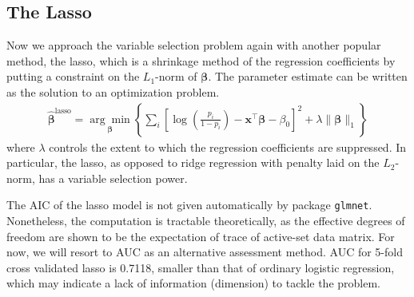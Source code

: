 \subsection{The Lasso}
Now we approach the variable selection problem again with another popular method, the lasso, which is a shrinkage method of the regression coefficients by putting a constraint on the $L_1$-norm of $\boldsymbol{\beta}$. The parameter estimate can be written as the solution to an optimization problem.
\begin{align}
\widehat{\boldsymbol{\beta}}^{\text{lasso}}=\underset{\boldsymbol{\beta}}{\arg\min}\left\{\sum_i\left[\log\left(\frac{p_i}{1-p_i}\right)-\mathbf{x}^\top\boldsymbol{\beta}-\beta_0\right]^2+\lambda\|\boldsymbol{\beta}\|_1\right\}
\end{align}
where $\lambda$ controls the extent to which the regression coefficients are suppressed. In particular, the lasso, as opposed to ridge regression with penalty laid on the $L_2$-norm, has a variable selection power.
\par The AIC of the lasso model is not given automatically by package \texttt{glmnet}. Nonetheless, the computation is tractable theoretically, as the effective degrees of freedom are shown to be the expectation of trace of active-set data matrix. For now, we will resort to AUC as an alternative assessment method. AUC for 5-fold cross validated lasso is 0.7118, smaller than that of ordinary logistic regression, which may indicate a lack of information (dimension) to tackle the problem.

